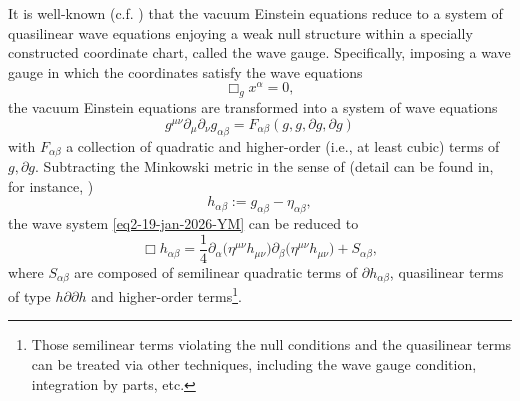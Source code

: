 \documentclass[a4paper,reqno]{amsart}
\theoremstyle{definition}
\numberwithin{equation}{section}
\begin{document}
It is well-known (c.f. \cite[Chapter VI.7]{YCB}) that the vacuum Einstein equations reduce to a system of quasilinear wave equations enjoying a weak null structure within a specially constructed coordinate chart, called the wave gauge. Specifically, imposing a wave gauge in which the coordinates satisfy the wave equations
\begin{equation}\label{eq1-19-jan-2026-YM}
\Box_{g} x^{\alpha} = 0,
\end{equation}
the vacuum Einstein equations are transformed into a system of wave equations
\begin{equation}\label{eq2-19-jan-2026-YM}
g^{\mu\nu}\partial_{\mu}\partial_{\nu}g_{\alpha\beta} = F_{\alpha\beta}(g,g,\partial g,\partial g) 
\end{equation}
with $F_{\alpha\beta}$ a collection of quadratic and higher-order (i.e., at least cubic) terms of $g,\partial g$. Subtracting the Minkowski metric in the sense of (detail can be found in, for instance,  \cite[page 15]{LindbladRodnianski2010})
$$
h_{\alpha\beta} := g_{\alpha\beta} - \eta_{\alpha\beta},
$$ 
the wave system \eqref{eq2-19-jan-2026-YM} can be reduced to 
\begin{equation}\label{eq3-19-jan-2026-YM}
\Box h_{\alpha\beta} = \frac{1}{4}\partial_{\alpha}\big(\eta^{\mu\nu}h_{\mu\nu}\big)\partial_{\beta}\big(\eta^{\mu\nu}h_{\mu\nu}\big) + S_{\alpha\beta},
\end{equation}
where $S_{\alpha\beta}$ are composed of semilinear quadratic terms of $\partial h_{\alpha\beta}$, quasilinear terms of type $h\partial\partial h$ and higher-order terms\footnote{Those semilinear terms violating the null conditions and the quasilinear terms can be treated via other techniques, including the wave gauge condition, integration by parts, etc.}.
\end{document}
